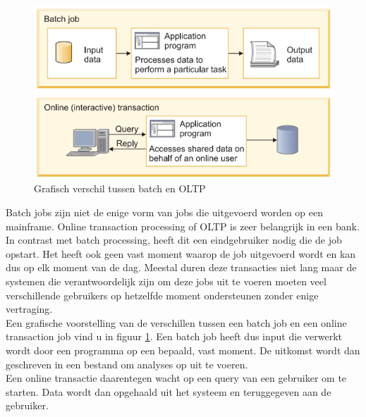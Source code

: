 \begin{figure}[ph!]
    \centering
    \includegraphics[width=400pt]{./graphics/BatchVSOnline.png}
    \caption{Grafisch verschil tussen batch en OLTP \autocite{IBMb}}
    \label{fig:online}
\end{figure}

Batch jobs zijn niet de enige vorm van jobs die uitgevoerd worden op een mainframe. Online transaction processing of OLTP is zeer belangrijk in een bank. In contrast met batch processing, heeft dit een eindgebruiker nodig die de job opstart. Het heeft ook geen vast moment waarop de job uitgevoerd wordt en kan dus op elk moment van de dag. Meestal duren deze transacties niet lang maar de systemen die verantwoordelijk zijn om deze jobs uit te voeren moeten veel verschillende gebruikers op hetzelfde moment ondersteunen zonder enige vertraging. \autocite{IBMb} \\

Een grafische voorstelling van de verschillen tussen een batch job en een online transaction job vind u in figuur \ref{fig:online}. Een batch job heeft dus input die verwerkt wordt door een programma op een bepaald, vast moment. De uitkomst wordt dan geschreven in een bestand om analyses op uit te voeren. \\
Een online transactie daarentegen wacht op een query van een gebruiker om te starten. Data wordt dan opgehaald uit het systeem en teruggegeven aan de gebruiker. \autocite{IBMb}


